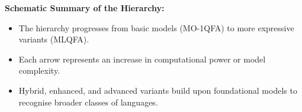 \noindent\textbf{Schematic Summary of the Hierarchy:}
\begin{itemize}
    \item The hierarchy progresses from basic models (MO-1QFA) to more expressive variants (MLQFA).
    \item Each arrow represents an increase in computational power or model complexity.
    \item Hybrid, enhanced, and advanced variants build upon foundational models to recognise broader classes of languages.
\end{itemize}
